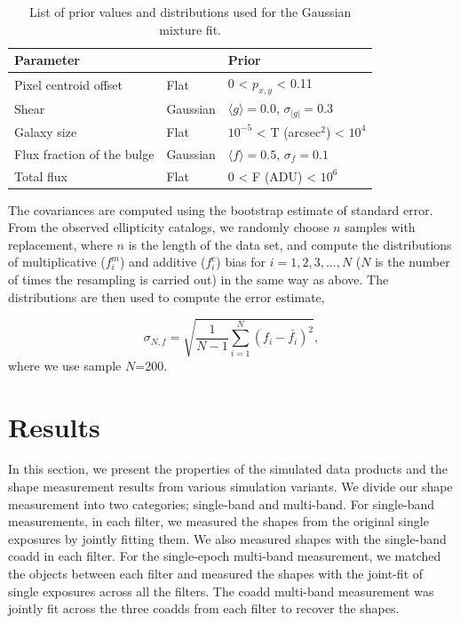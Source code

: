 \documentclass[fleqn,usenatbib]{mnras}
\begin{document}
\begin{table}
    \centering
    \begin{tabular}{l l l}
    \hline
    Parameter & &  Prior \\
    \hline
    Pixel centroid offset & Flat & 0 < $p_{x,y}$ < 0.11\\
    Shear & Gaussian &$\langle g\rangle = 0.0$, $\sigma_{|g|} = 0.3$\\
    Galaxy size & Flat &$10^{-5}$ < T (arcsec$^2$) < $10^{4}$\\
    Flux fraction of the bulge  & Gaussian &$\langle f\rangle = 0.5$, $\sigma_{f} = 0.1$\\
    Total flux & Flat &$0$ < F (ADU) < $10^{6}$\\
    \hline
    \end{tabular}
    \caption{List of prior values and distributions used for the Gaussian mixture fit.}
    \label{tab:priors}
\end{table}

The covariances are computed using the bootstrap estimate of standard error. From the observed ellipticity catalogs, we randomly choose $n$ samples with replacement, where $n$ is the length of the data set, and compute the distributions of multiplicative ($f^{m}_{i}$) and additive ($f^{c}_{i}$) bias for $i=1,2,3,...,N$ ($N$ is the number of times the resampling is carried out) in the same way as above. The distributions are then used to compute the error estimate,  


\begin{equation}
    \sigma_{N,f} = \sqrt{\frac{1}{N-1} \sum_{i=1}^{N}(f_{i}-\bar{f_{i}})^{2}}, 
\end{equation}
where we use sample $N$=200.


\section{Results}
\label{sec:results}
In this section, we present the properties of the simulated data products and the shape measurement results from various simulation variants. We divide our shape measurement into two categories; single-band and multi-band. For single-band measurements, in each filter, we measured the shapes from the original single exposures by jointly fitting them. We also measured shapes with the single-band coadd in each filter. For the single-epoch multi-band measurement, we matched the objects between each filter and measured the shapes with the joint-fit of single exposures across all the filters. The coadd multi-band measurement was jointly fit across the three coadds from each filter to recover the shapes. 
\end{document}
